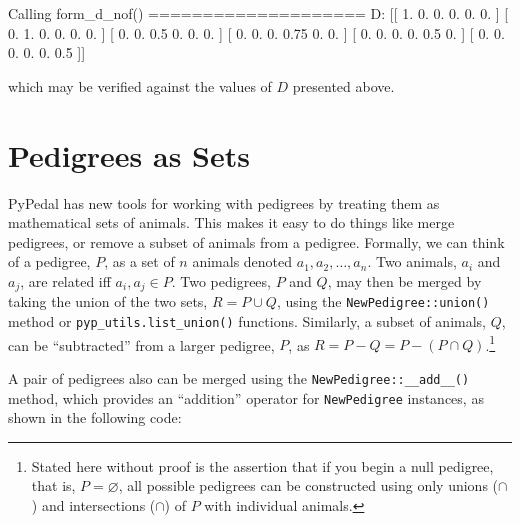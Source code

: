 \documentclass[
  letterpaper,
  DIV=11,
  numbers=noendperiod]{scrreprt}
\newenvironment{Shaded}{\begin{snugshade}}{\end{snugshade}}
\newcommand{\FloatTok}[1]{\textcolor[rgb]{0.68,0.00,0.00}{#1}}
\newcommand{\NormalTok}[1]{\textcolor[rgb]{0.00,0.23,0.31}{#1}}
\newcommand{\OperatorTok}[1]{\textcolor[rgb]{0.37,0.37,0.37}{#1}}
\begin{document}
\begin{Shaded}
\begin{Highlighting}[]
\NormalTok{Calling form\_d\_nof()}
\OperatorTok{====================}
\NormalTok{D:  [[ }\FloatTok{1.}    \FloatTok{0.}    \FloatTok{0.}    \FloatTok{0.}      \FloatTok{0.}    \FloatTok{0.}\NormalTok{   ]}
\NormalTok{       [ }\FloatTok{0.}    \FloatTok{1.}    \FloatTok{0.}    \FloatTok{0.}      \FloatTok{0.}    \FloatTok{0.}\NormalTok{   ]}
\NormalTok{       [ }\FloatTok{0.}    \FloatTok{0.}    \FloatTok{0.5}  \FloatTok{0.}      \FloatTok{0.}    \FloatTok{0.}\NormalTok{   ]}
\NormalTok{       [ }\FloatTok{0.}    \FloatTok{0.}    \FloatTok{0.}    \FloatTok{0.75}  \FloatTok{0.}    \FloatTok{0.}\NormalTok{   ]}
\NormalTok{       [ }\FloatTok{0.}    \FloatTok{0.}    \FloatTok{0.}    \FloatTok{0.}      \FloatTok{0.5}   \FloatTok{0.}\NormalTok{  ]}
\NormalTok{       [ }\FloatTok{0.}    \FloatTok{0.}    \FloatTok{0.}    \FloatTok{0.}      \FloatTok{0.}    \FloatTok{0.5}\NormalTok{ ]]}
\end{Highlighting}
\end{Shaded}

which may be verified against the values of \(D\) presented above.

\section{Pedigrees as Sets}\label{sec-pedigrees-as-sets}

PyPedal has new tools for working with pedigrees by treating them as
mathematical sets of animals. This makes it easy to do things like merge
pedigrees, or remove a subset of animals from a pedigree. Formally, we
can think of a pedigree, \(P\), as a set of \(n\) animals denoted
\(a_1, a_2, \ldots, a_n\). Two animals, \(a_i\) and \(a_j\), are related
iff \(a_i, a_j \in P\). Two pedigrees, \(P\) and \(Q\), may then be
merged by taking the union of the two sets, \(R = P \cup Q\), using the
\texttt{NewPedigree::union()} method or
\texttt{pyp\_utils.list\_union()} functions. Similarly, a subset of
animals, \(Q\), can be ``subtracted'' from a larger pedigree, \(P\), as
\(R = P - Q = P - (P \cap Q)\).\footnote{Stated here without proof is
  the assertion that if you begin a null pedigree, that is,
  \(P = \varnothing\), all possible pedigrees can be constructed using
  only unions (\(\cap\)) and intersections (\(\cap\)) of \(P\) with
  individual animals.}

A pair of pedigrees also can be merged using the
\texttt{NewPedigree::\_\_add\_\_()} method, which provides an
``addition'' operator for \texttt{NewPedigree} instances, as shown in
the following code:
\end{document}
